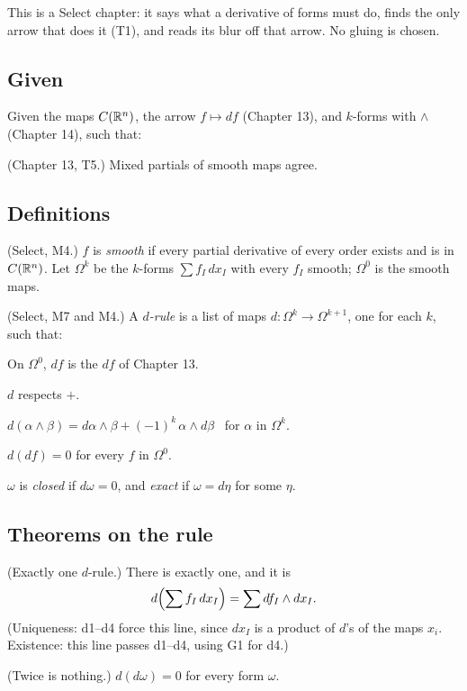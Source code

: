 This is a Select chapter: it says what a derivative of forms must do, finds the only arrow that does it (T1), and reads its blur off that arrow. No gluing is chosen.

\subsection*{Given}

Given the maps $C(\mathbb{R}^n)$, the arrow $f \mapsto df$ (Chapter 13), and $k$-forms with $\wedge$ (Chapter 14), such that:
\begin{lines}
\item[\lab{G1}] (Chapter 13, T5.) Mixed partials of smooth maps agree.
\end{lines}

\subsection*{Definitions}

\begin{lines}
\item[\lab{D1}] (Select, M4.) $f$ is \emph{smooth} if every partial derivative of every order exists and is in $C(\mathbb{R}^n)$. Let $\Omega^k$ be the $k$-forms $\sum f_I\, dx_I$ with every $f_I$ smooth; $\Omega^0$ is the smooth maps.
\item[\lab{D2}] (Select, M7 and M4.) A \emph{$d$-rule} is a list of maps $d : \Omega^k \to \Omega^{k+1}$, one for each $k$, such that:
\begin{lines}
\item[\lab{d1}] On $\Omega^0$, $d f$ is the $df$ of Chapter 13.
\item[\lab{d2}] $d$ respects $+$.
\item[\lab{d3}] $d(\alpha \wedge \beta) = d\alpha \wedge \beta + (-1)^k\, \alpha \wedge d\beta$ \ for $\alpha$ in $\Omega^k$.
\item[\lab{d4}] $d(df) = 0$ for every $f$ in $\Omega^0$.
\end{lines}
\item[\lab{D3}] $\omega$ is \emph{closed} if $d\omega = 0$, and \emph{exact} if $\omega = d\eta$ for some $\eta$.
\end{lines}

\subsection*{Theorems on the rule}

\begin{lines}
\item[\lab{T1}] (Exactly one $d$-rule.) There is exactly one, and it is
\[
d\Bigl(\sum f_I\, dx_I\Bigr) = \sum df_I \wedge dx_I .
\]
(Uniqueness: d1--d4 force this line, since $dx_I$ is a product of $d$'s of the maps $x_i$. Existence: this line passes d1--d4, using G1 for d4.)
\item[\lab{T2}] (Twice is nothing.) $d(d\omega) = 0$ for every form $\omega$.
\end{lines}

